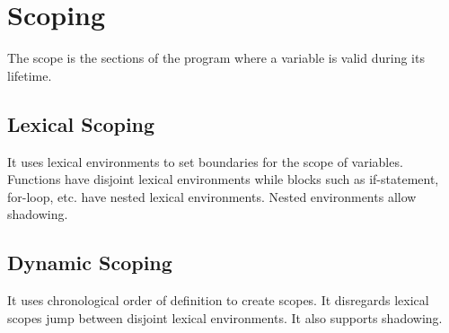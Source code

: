 \section{Scoping}
The scope is the sections of the program where a variable is valid
during its lifetime.

\subsection*{Lexical Scoping}
It uses lexical environments to set boundaries for the scope of
variables. Functions have disjoint lexical environments while blocks
such as if-statement, for-loop, etc. have nested lexical environments.
Nested environments allow shadowing.

\subsection*{Dynamic Scoping}
It uses chronological order of definition to create scopes. It
disregards lexical scopes jump between disjoint lexical environments. It
also supports shadowing.
